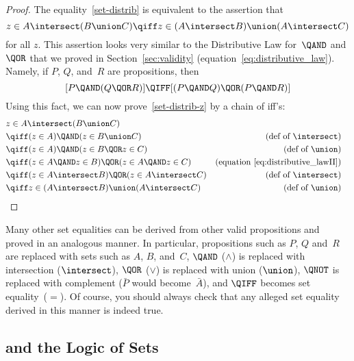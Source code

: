 \begin{proof}
The equality~\eqref{set-distrib} is equivalent to the assertion that
\begin{equation}\label{set-distrib-z}
  z \in A \intersect (B \union C) \qiff z \in (A \intersect B)
  \union (A \intersect C)
\end{equation}
for all $z$.  This assertion looks very similar to the Distributive Law
for~$\QAND$ and $\QOR$ that we proved in Section~\ref{sec:validity}
(equation~\ref{eq:distributive_law}).  Namely, if $P$, $Q$, and~$R$
are propositions, then
\begin{equation}\label{eq:distributive_lawII}
[P \QAND (Q \QOR R)] \QIFF [(P \QAND Q) \QOR (P \QAND R)]
\end{equation}
Using this fact, we can now prove~\eqref{set-distrib-z} by a chain of
iff's:
\begin{align*}
\lefteqn{z \in A \intersect (B \union C)}\\
& \qiff (z \in A) \QAND (z \in B \union C) & \text{(def of $\intersect$)}\\
& \qiff (z \in A) \QAND (z \in B \QOR z \in C)
                & \text{(def of $\union$)}\\
& \qiff (z \in A \QAND z \in B) \QOR (z \in A \QAND z \in C)
                & \text{(equation~\ref{eq:distributive_lawII})}\\
& \qiff (z \in A \intersect B) \QOR (z \in A \intersect C)
                & \text{(def of $\intersect$)}\\
& \qiff z \in (A \intersect B) \union (A \intersect C)
                & \text{(def of $\union$)} & \qedhere
\end{align*}
\end{proof}

Many other set equalities can be derived from other valid propositions
and proved in an analogous manner.  In particular, propositions such
as $P$, $Q$ and~$R$ are replaced with sets such as $A$, $B$, and~$C$,
$\QAND$ ($\land$) is replaced with intersection ($\intersect$), $\QOR$
($\lor$) is replaced with union ($\union$), $\QNOT$ is replaced with
complement (\eg $\bar{P}$ would become~$\bar{A}$), and $\QIFF$ becomes
set equality~($=$).  Of course, you should always check that any
alleged set equality derived in this manner is indeed true.

\begin{problems}
\homeworkproblems
{}
\end{problems}

\subsection{ and the Logic of Sets}


